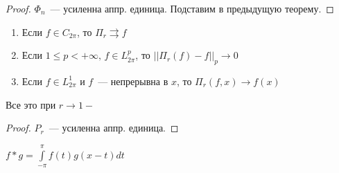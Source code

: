 \begin{proof}
	$\Phi_n$~--- усиленна аппр. единица. Подставим в предыдущую теорему.
\end{proof}

\begin{theorem}
	\begin{enumerate}
		\item Если $f \in C_{2\pi}$, то $\Pi_r \rightrightarrows f$
	
	\item Если $1 \leqslant p < +\infty, \, f \in L_{2\pi}^p$, то $||\Pi_r(f) - f||_p \rightarrow 0$ 
	
	\item Если $f \in L_{2\pi}^1$ и $f$~--- непрерывна в $x$, то $\Pi_r(f, x) \rightarrow f(x)$
	\end{enumerate}
	Все это при $r \rightarrow 1-$
	
\end{theorem}

\begin{proof}
	$P_r$~--- усиленна аппр. единица.
\end{proof}

\begin{observation}
	$f \ast g = \int\limits_{-\pi}^{\pi} f(t) g(x-t) dt$ 
\end{observation}

